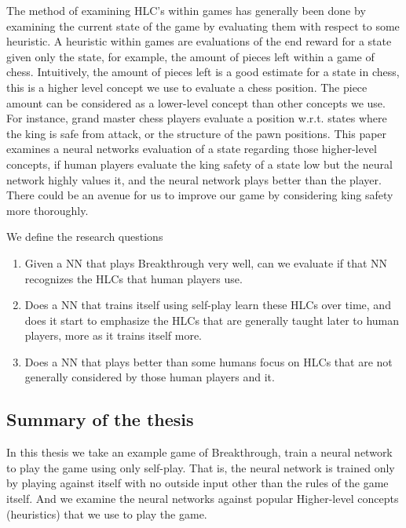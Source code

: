 The method of examining HLC's within games has generally been done by examining the
current state of the game by evaluating them with respect to some heuristic. A heuristic within
games are evaluations of the end reward for a state given only the state, for example,
the amount of pieces left within a game of chess. Intuitively, the amount of pieces
left is a good estimate for a state in chess, this is a higher level concept we
use to evaluate a chess position. The piece amount can be considered as a lower-level concept
than other concepts we use. For instance, grand master chess players evaluate a position w.r.t. states
where the king is safe from attack, or the structure of the pawn positions.
This paper examines a neural networks evaluation of a state regarding
those higher-level concepts, if human players evaluate the king safety of a state
low but the neural network highly values it, and the neural network plays better
than the player. There could be an avenue for us to improve our game by considering king safety more thoroughly.

We define the research questions

\begin{enumerate}
  \item Given a NN that plays Breakthrough very well, can we evaluate if that NN recognizes the 
  HLCs that human players use.
  \item Does a NN that trains itself using self-play learn these HLCs over time, and does it start to emphasize 
  the HLCs that are generally taught later to human players, more as it trains itself more.
  \item Does a NN that plays better than some humans focus on HLCs that are not generally 
  considered by those human players and it.
\end{enumerate}

\subsection{Summary of the thesis}

In this thesis we take an example game of Breakthrough, train a neural network to play the game
using only self-play. That is, the neural network is trained only by playing against
itself with no outside input other than the rules of the game itself. And we examine
the neural networks against popular Higher-level concepts (heuristics) that we use
to play the game.
